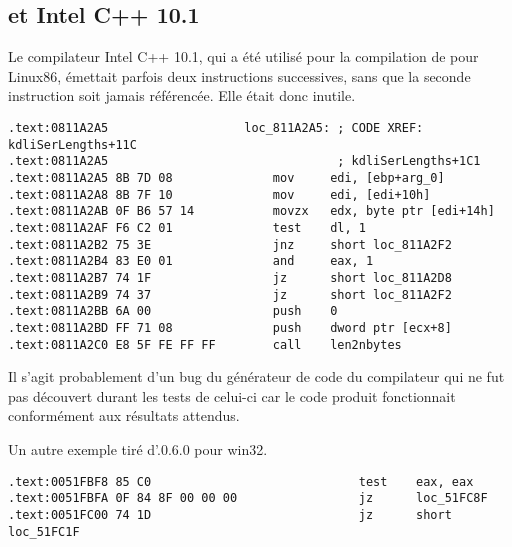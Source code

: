 ﻿
\label{anomaly:Intel}
\myindex{\CompilerAnomaly}

\subsection{ et Intel C++ 10.1}

\myindex{\oracle}

Le compilateur Intel C++ 10.1, qui a été utilisé pour la compilation de  pour Linux86, émettait parfois deux instructions \JZ successives, sans que
la seconde instruction soit jamais référencée. Elle était donc inutile.



\begin{lstlisting}[caption=from the same code,style=customasmx86]
.text:0811A2A5                   loc_811A2A5: ; CODE XREF: kdliSerLengths+11C
.text:0811A2A5                                ; kdliSerLengths+1C1
.text:0811A2A5 8B 7D 08              mov     edi, [ebp+arg_0]
.text:0811A2A8 8B 7F 10              mov     edi, [edi+10h]
.text:0811A2AB 0F B6 57 14           movzx   edx, byte ptr [edi+14h]
.text:0811A2AF F6 C2 01              test    dl, 1
.text:0811A2B2 75 3E                 jnz     short loc_811A2F2
.text:0811A2B4 83 E0 01              and     eax, 1
.text:0811A2B7 74 1F                 jz      short loc_811A2D8
.text:0811A2B9 74 37                 jz      short loc_811A2F2
.text:0811A2BB 6A 00                 push    0
.text:0811A2BD FF 71 08              push    dword ptr [ecx+8]
.text:0811A2C0 E8 5F FE FF FF        call    len2nbytes
\end{lstlisting}

Il s'agit probablement d'un bug du générateur de code du compilateur qui ne fut pas
découvert durant les tests de celui-ci car le code produit fonctionnait conformément
aux résultats attendus.

Un autre exemple tiré d'.0.6.0 pour win32.

\begin{lstlisting}
.text:0051FBF8 85 C0                             test    eax, eax
.text:0051FBFA 0F 84 8F 00 00 00                 jz      loc_51FC8F
.text:0051FC00 74 1D                             jz      short loc_51FC1F
\end{lstlisting}




